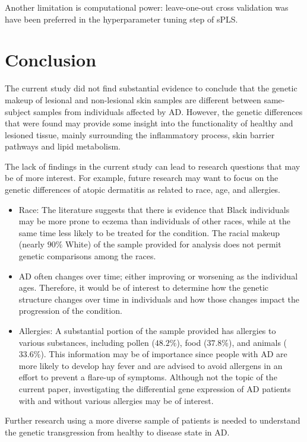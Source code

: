 \documentclass[journal, a4paper]{IEEEtran}
\begin{document}
Another limitation is computational power: leave-one-out cross validation was have been preferred in the hyperparameter tuning step of sPLS.


\section{Conclusion}

The current study did not find substantial evidence to conclude that the genetic makeup of lesional and non-lesional skin samples are different between same-subject samples from individuals affected by AD. However, the genetic differences that were found may provide some insight into the functionality of healthy and lesioned tissue, mainly surrounding the inflammatory process, skin barrier pathways and lipid metabolism.

The lack of findings in the current study can lead to research questions that may be of more interest. For example, future research may want to focus on the genetic differences of atopic dermatitis as related to race, age, and allergies.
\begin{itemize}
  \item Race: The literature suggests that there is evidence that Black individuals may be more prone to eczema than individuals of other races, while at the same time less likely to be treated for the condition. The racial makeup (nearly $90\%$ White) of the sample provided for analysis does not permit genetic comparisons among the races.
  \item  AD often changes over time; either improving or worsening as the individual ages. Therefore, it would be of interest to determine how the genetic structure changes over time in individuals and how those changes impact the progression of the condition.
  \item Allergies:  A substantial portion of the sample provided has allergies to various substances, including pollen ($48.2\%$), food ($37.8\%$), and animals ($33.6\%$). This information may be of importance since people with AD are more likely to develop hay fever and are advised to avoid allergens in an effort to prevent a flare-up of symptoms. Although not the topic of the current paper, investigating the differential gene expression of AD patients with and without various allergies may be of interest.
\end{itemize}

Further research using a more diverse sample of patients is needed to understand the genetic transgression from healthy to disease state in AD. 



\end{document}
